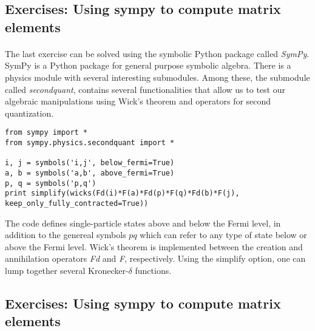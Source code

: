 \documentclass[%
twoside,                 %
final,                   %
10pt]{article}
\begin{document}
\subsection*{Exercises: Using sympy to compute matrix elements}

\paragraph{}
The last exercise can be solved using the symbolic Python package called \emph{SymPy}. SymPy is a Python 
package for general purpose symbolic algebra. There is a physics module with several interesting submodules.
Among these, the submodule called \emph{secondquant}, contains several  functionalities that allow us to test
our algebraic manipulations using Wick's theorem and operators for second quantization.
\begin{verbatim}
from sympy import *
from sympy.physics.secondquant import *

i, j = symbols('i,j', below_fermi=True)
a, b = symbols('a,b', above_fermi=True)
p, q = symbols('p,q')
print simplify(wicks(Fd(i)*F(a)*Fd(p)*F(q)*Fd(b)*F(j), keep_only_fully_contracted=True))
\end{verbatim}
The code defines single-particle states above and below the Fermi level, in addition to the genereal symbols
$pq$ which can refer to any type of state below or above the Fermi level. Wick's theorem is implemented between 
the creation and annihilation operators \emph{Fd} and \emph{F}, respectively. Using the simplify option, one can lump together several Kronecker-$\delta$ functions.




\subsection*{Exercises: Using sympy to compute matrix elements}

\end{document}
